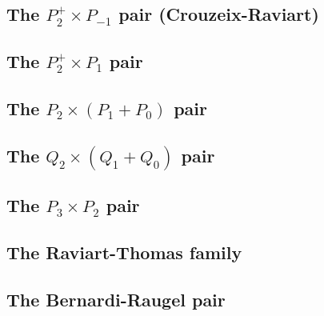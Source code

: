 \subsection{The ${ P}_2^+\times P_{-1}$ pair  (Crouzeix-Raviart) } \label{sec:crouzeix-raviart}


\subsection{The ${ P}_2^+\times P_{1}$ pair \label{ss:p2pp1}}


\subsection{The ${ P}_2\times (P_1+P_0)$ pair} \label{ss:p2p1p0}


\subsection{The ${ Q}_2\times (Q_1+Q_0)$ pair} \label{ss:q2q1q0}


\subsection{The ${ P}_3\times P_2$ pair} \label{ss:p3p2}


\subsection{The Raviart-Thomas family} \label{ss:raviart_thomas}


\subsection{The Bernardi-Raugel pair} \label{ss:bernardi_raugel}


